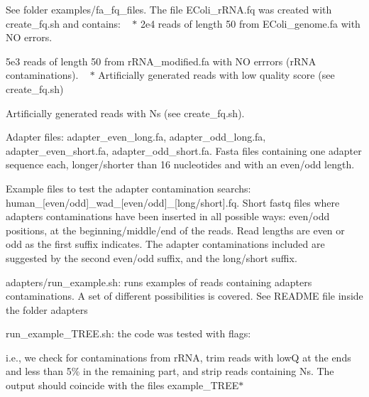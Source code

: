 \begin{DoxyEnumerate}
\item See folder {\ttfamily examples/fa\+\_\+fq\+\_\+files}. The file {\ttfamily E\+Coli\+\_\+r\+R\+N\+A.\+fq} was created with {\ttfamily create\+\_\+fq.\+sh} and contains\+: ~\newline
 $\ast$ 2e4 reads of length 50 from {\ttfamily E\+Coli\+\_\+genome.\+fa} with NO errors.
\begin{DoxyItemize}
\item 5e3 reads of length 50 from {\ttfamily r\+R\+N\+A\+\_\+modified.\+fa} with NO errrors (r\+R\+NA contaminations). ~\newline
 $\ast$ Artificially generated reads with low quality score (see {\ttfamily create\+\_\+fq.\+sh})
\item Artificially generated reads with Ns (see {\ttfamily create\+\_\+fq.\+sh}).
\item Adapter files\+: {\ttfamily adapter\+\_\+even\+\_\+long.\+fa}, {\ttfamily adapter\+\_\+odd\+\_\+long.\+fa}, {\ttfamily adapter\+\_\+even\+\_\+short.\+fa}, {\ttfamily adapter\+\_\+odd\+\_\+short.\+fa}. Fasta files containing one adapter sequence each, longer/shorter than 16 nucleotides and with an even/odd length.
\item Example files to test the adapter contamination searchs\+: {\ttfamily human\+\_\+\mbox{[}even/odd\mbox{]}\+\_\+wad\+\_\+\mbox{[}even/odd\mbox{]}\+\_\+\mbox{[}long/short\mbox{]}.fq}. Short fastq files where adapters contaminations have been inserted in all possible ways\+: even/odd positions, at the beginning/middle/end of the reads. Read lengths are even or odd as the first suffix indicates. The adapter contaminations included are suggested by the second even/odd suffix, and the long/short suffix.
\end{DoxyItemize}
\item {\ttfamily adapters/run\+\_\+example.\+sh}\+: runs examples of reads containing adapters contaminations. A set of different possibilities is covered. See R\+E\+A\+D\+ME file inside the folder {\ttfamily adapters}
\item {\ttfamily run\+\_\+example\+\_\+\+T\+R\+E\+E.\+sh}\+: the code was tested with flags\+: 
 i.\+e., we check for contaminations from r\+R\+NA, trim reads with lowQ at the ends and less than 5\% in the remaining part, and strip reads containing N\textquotesingle{}s. The output should coincide with the files {\ttfamily example\+\_\+\+T\+R\+E\+E$\ast$} ~\newline

\end{DoxyEnumerate}

